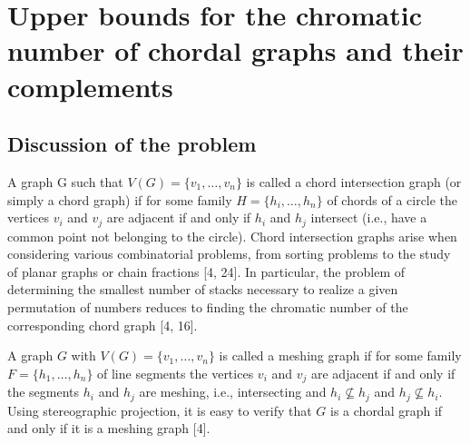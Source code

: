 \documentclass{article}
\theoremstyle{definition}
\begin{document}
    \section{Upper bounds for the chromatic number
    of chordal graphs and their complements}

    \subsection{Discussion of the problem}

    A graph G such that
    $V(G)=\{v_1,\ldots, v_n\}$ is called 
    a chord intersection graph
    (or simply a chord graph) 
    if for some family $H = \{h_{i}, \ldots, h_{n}\}$
    of chords of a circle the 
    vertices $v_{i}$ and $v_{j}$
    are adjacent if and only if 
    $h_{i}$ and $h_{j}$ 
    intersect (i.e., have a common point
    not belonging to the circle). 
    Chord intersection graphs arise 
    when considering various
    combinatorial problems,
    from sorting problems to 
    the study of planar graphs
    or chain fractions [4, 24].
    In particular, the problem 
    of determining the smallest
    number of stacks necessary to
    realize a given permutation 
    of numbers reduces to finding 
    the chromatic number of 
    the corresponding chord graph [4, 16].

    A graph $G$ with $V(G) = \{v_{1}, \ldots, v_{n}\}$
    is called a meshing graph if 
    for some family $F = \{h_1, \ldots, h_n\}$ 
    of line segments the vertices 
    $v_{i}$ and $v_{j}$ are adjacent 
    if and only if the segments 
    $h_{i}$ and $h_{j}$ are meshing, 
    i.e., intersecting and $h_{i} \not \subseteq  h_{j}$
    and $h_{j} \not \subseteq h_{i}$.  
    Using stereographic projection, 
    it is easy to verify that $G$ is a chordal graph
    if and only if it is a meshing graph [4].
\end{document}
